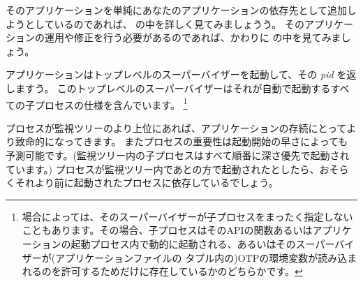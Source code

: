 そのアプリケーションを単純にあなたのアプリケーションの依存先として追加しようとしているのであれば、 の中を詳しく見てみましょうう。
そのアプリケーションの運用や修正を行う必要があるのであれば、かわりに  の中を見てみましょう。

アプリケーションはトップレベルのスーパーバイザーを起動して、その \emph{pid} を返しますう。
このトップレベルのスーパーバイザーはそれが自動で起動するすべての子プロセスの仕様を含んでいます。 \footnote{場合によっては、そのスーパーバイザーが子プロセスをまったく指定しないこともあります。その場合、子プロセスはそのAPIの関数あるいはアプリケーションの起動プロセス内で動的に起動される、あるいはそのスーパーバイザーが(アプリケーションファイルの  タプル内の)OTPの環境変数が読み込まれるのを許可するためだけに存在しているかのどちらかです。}

プロセスが監視ツリーのより上位にあれば、アプリケーションの存続にとってより致命的になってきます。
またプロセスの重要性は起動開始の早さによっても予測可能です。(監視ツリー内の子プロセスはすべて順番に深さ優先で起動されています。)
プロセスが監視ツリー内であとの方で起動されたとしたら、おそらくそれより前に起動されたプロセスに依存しているでしょう。

